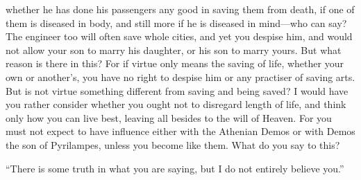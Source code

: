 \documentclass[11pt,letter]{article}
\begin{document}
whether he has done his passengers any good in saving them from death, if one of them is diseased in body, and still more if he is diseased in mind—who can say? The engineer too will often save whole cities, and yet you despise him, and would not allow your son to marry his daughter, or his son to marry yours. But what reason is there in this? For if virtue only means the saving of life, whether your own or another’s, you have no right to despise him or any practiser of saving arts. But is not virtue something different from saving and being saved? I would have you rather consider whether you ought not to disregard length of life, and think only how you can live best, leaving all besides to the will of Heaven. For you must not expect to have influence either with the Athenian Demos or with Demos the son of Pyrilampes, unless you become like them. What do you say to this?

\par  “There is some truth in what you are saying, but I do not entirely believe you.”
\end{document}
